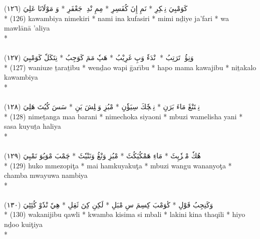 \documentclass[a4paper, 12pt]{report}
\begin{document}
\begin{center}
\textarabic{(١٢٦) \textcolor{mygreen}{كَوَمْبِيَ نِمٖكِرِ  * نَمِ إِنَ كُفَسِرِ  * مِمِ نْدِيٖ جَعْفَرِ  * وَ مَوْلَانَا عَلِيَ }} \\* 
(126) kawambiya nimekiri  * nami ina kufasiri  * mimi nḏiye ja'fari  * wa mawlānā 'aliya  \\* 
 \\ 
\\[8mm] 

\textarabic{(١٢٧) \textcolor{mygreen}{وَنِؤُزٖ تَرَتِبُ  * وٖنْدَءٗ وَپِ غَرِيْبُ  * هَپٗ مَمَ كَوَجِبُ  * نِتَكَلٗ كَوَمْبِيَ }} \\* 
(127) waniuze ṯaraṯibu  * wenḏao wapi ḡarı̄bu  * hapo mama kawajibu  * niṯakalo kawambiya  \\* 
 \\ 
\\[8mm] 

\textarabic{(١٢٨) \textcolor{mygreen}{نِمٖتَنْڠَ مَاءَ بَرَنِ  * نِمٖچٗكَ سِيَؤٗنِ  * مْبُزِ وَمٖلِشَ يَنِ  * سَسَ كُيُتَ هَلِيَ }} \\* 
(128) nimeṯanga maa barani  * nimechoka siyaoni  * mbuzi wamelisha yani  * sasa kuyuṯa haliya  \\* 
 \\ 
\\[8mm] 

\textarabic{(١٢٩) \textcolor{mygreen}{هُكٗ مْمٖزٗپِٹَ  * مَاءِ هَمْكُيَكُٹَ  * مْبُزِ وَنْڠُ وَنَنْيٗٹَ  * چَمْبَ مْوَيُوَ نَمْبِيَ }} \\* 
(129) huko mmezopiţa  * mai hamkuyakuţa  * mbuzi wangu wananyoţa  * chamba mwayuwa nambiya  \\* 
 \\ 
\\[8mm] 

\textarabic{(١٣٠) \textcolor{mygreen}{وَكَنِجِبُ قَوْلِ  * كٔوَمْبَ كِسِمَ سِ مْبَلِ  * لَكِنِ كِنَ ثَقِلِ  * هِيٗ نْدٗوْ كُئِٹِيَ }} \\* 
(130) wakanijibu qawli  * kwamba kisima si mbali  * lakini kina thaqili  * hiyo nḏoo kuiţiya  \\* 
 \\ 
\\[8mm] 


\end{center}
\end{document}
